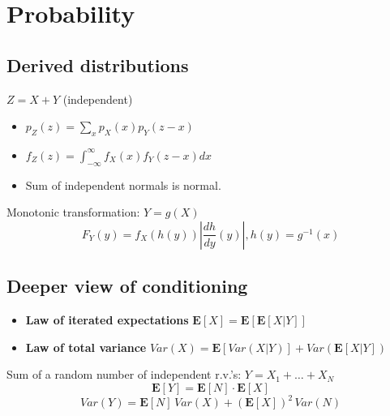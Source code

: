 \section{Probability} 

\subsection*{Derived distributions}

$Z = X+Y$ (independent)
\begin{itemize}
\item $p_Z(z) = \sum_x p_X(x) p_Y(z-x)$
\item $f_Z(z) = \int_{-\infty}^{\infty} f_X(x) f_Y(z-x) dx$
\item Sum of independent normals is normal. 
\end{itemize}

Monotonic transformation: $Y = g(X)$
\[ F_Y(y) = f_X(h(y))\left|\frac{dh}{dy}(y)\right|, h(y) = g^{-1}(x) \]

\subsection*{Deeper view of conditioning}
\begin{itemize}
\item \textbf{Law of iterated expectations} $\mathbf{E}[X] = \mathbf{E}\left[\mathbf{E}[X|Y] \right]$
\item \textbf{Law of total variance} $Var(X) = \mathbf{E}\left[Var(X|Y)\right] + Var(\mathbf{E}[X|Y])$
\end{itemize}

Sum of a random number of independent r.v.'s: $Y = X_1 + \ldots + X_N$
\[ \mathbf{E}[Y] = \mathbf{E}[N] \cdot \mathbf{E}[X] \]
\[ Var(Y) = \mathbf{E}[N]\,Var(X) + (\mathbf{E}[X])^2\,Var(N) \]
